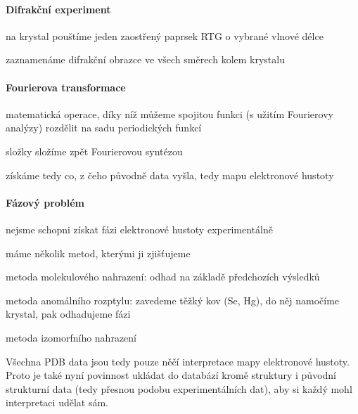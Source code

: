 \documentclass[DIV=8]{scrreprt}
\begin{document}
\paragraph{Difrakční experiment}
\begin{myItemize}[nosep]
    \item na krystal pouštíme jeden zaostřený paprsek RTG o vybrané vlnové délce
    \item zaznamenáme difrakční obrazce ve všech směrech kolem krystalu
\end{myItemize}



\paragraph{Fourierova transformace}
\begin{myItemize}[nosep]
    \item matematická operace, díky níž můžeme spojitou funkci (s užitím Fourierovy analýzy) rozdělit na sadu periodických funkcí
    \item složky složíme zpět Fourierovou syntézou
    \item získáme tedy co, z čeho původně data vyšla, tedy mapu elektronové hustoty
\end{myItemize}



\paragraph{Fázový problém}
\begin{myItemize}[nosep]
    \item nejsme schopni získat fázi elektronové hustoty experimentálně
    \item máme několik metod, kterými ji zjišťujeme
\begin{myItemize}[nosep]
    \item metoda molekulového nahrazení: odhad na základě předchozích výsledků
    \item metoda anomálního rozptylu: zavedeme těžký kov (Se, Hg), do něj namočíme krystal, pak odhadujeme fázi
    \item metoda izomorfního nahrazení
\end{myItemize}

\end{myItemize}



Všechna PDB data jsou tedy pouze něčí interpretace mapy elektronové hustoty. Proto je také nyní povinnost ukládat do databází kromě struktury i původní strukturní data (tedy přesnou podobu experimentálních dat), aby si každý mohl interpretaci udělat sám.
\end{document}
